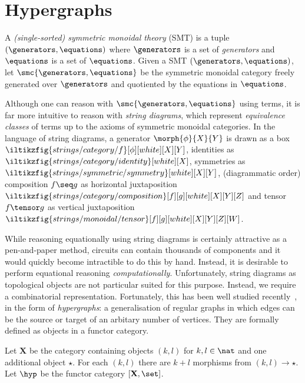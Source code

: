 \section{Hypergraphs}

\begin{definition}
    A \emph{(single-sorted) symmetric monoidal theory} (SMT) is a tuple \(
        (\generators,\equations)
    \) where \(\generators\) is a set of \emph{generators} and \(\equations\)
    is a set of \(\equations\).
    Given a SMT \((\generators,\equations)\), let \(
        \smc{\generators,\equations}
    \) be the symmetric monoidal category freely generated over \(\generators\)
    and quotiented by the equations in \(\equations\).
\end{definition}

Although one can reason with \(\smc{\generators, \equations}\) using terms, it
is far more intuitive to reason with \emph{string diagrams}, which represent
\emph{equivalence classes} of terms up to the axioms of symmetric monoidal
categories.
In the language of string diagrams, a generator \(\morph{\phi}{X}{Y}\) is drawn
as a box \(
    \iltikzfig{strings/category/f}[\phi][white][X][Y]
\), identities as \(
    \iltikzfig{strings/category/identity}[white][X]
\), symmetries as \(
    \iltikzfig{strings/symmetric/symmetry}[white][X][Y]
\), (diagrammatic order) composition \(f \seq g\) as horizontal juxtaposition \(
    \iltikzfig{strings/category/composition}[f][g][white][X][Y][Z]
\) and tensor \(f \tensor g\) as vertical juxtaposition \(
    \iltikzfig{strings/monoidal/tensor}[f][g][white][X][Y][Z][W]
\).

While reasoning equationally using string diagrams is certainly attractive
as a pen-and-paper method, circuits can contain thousands of components and it
would quickly become intractible to do this by hand.
Instead, it is desirable to perform equational reasoning \emph{computationally}.
Unfortunately, string diagrams as topological objects are not particular suited
for this purpose.
Instead, we require a combinatorial representation.
Fortunately, this has been well studied
recently~\cite{bonchi2022string,bonchi2021string,bonchi2022stringa}, in the
form of \emph{hypergraphs}: a generalisation of regular graphs in which edges
can be the source or target of an arbitary number of vertices.
They are formally defined as objects in a functor category.

\begin{definition}[Hypergraph]
    Let \(\mathbf{X}\) be the category containing objects \((k, l)\) for
    \(k, l \in \nat\) and one additional object \(\star\).
    For each \((k, l)\) there are \(k + l\) morphisms from \((k, l) \to \star\).
    Let \(\hyp\) be the functor category \([\mathbf{X},\set]\).
\end{definition}

